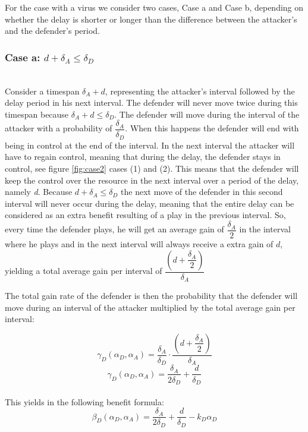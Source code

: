 \documentclass[journal,a4paper]{IEEEtran}
\begin{document}
For the case with a virus we consider two cases, Case a and Case b, depending on whether the delay is shorter or longer than the difference between the attacker's and the defender's period.  \\


\subsubsection*{\textbf{Case a:} $d + \delta_{A} \leq \delta_{D}$}
~~\\
Consider a timespan $\delta_{A} + d$, representing the attacker's interval followed by the delay period in his next interval. The defender will never move twice during this timespan because $\delta_{A} + d \leq \delta_{D}$. The defender will move during the interval of the attacker with a probability of $\dfrac{\delta_{A}}{\delta_{D}} $. When this happens the defender will end with being in control at the end of the interval. In the next interval the attacker will have to regain control, meaning that during the delay, the defender stays in control, see figure \ref{fig:case2} cases (1) and (2). This means that the defender will keep the control over the resource in the next interval over a period of the delay, namely \textit{d}. Because $d + \delta_{A} \leq \delta_{D}$ the next move of the defender in this second interval will never occur during the delay, meaning that the entire delay can be considered as an extra benefit resulting of a play in the previous interval. 
So, every time the defender plays, he will get an average gain of $\dfrac{\delta_{A}}{2}$ in the interval where he plays and in the next interval will always receive a extra gain of $d$, yielding a total average gain per interval of
$\dfrac{(d+\dfrac{\delta_{A}}{2})}{\delta_{A}}$

The total gain  rate of the defender is then the probability that the defender will move during an interval of the attacker multiplied by the total average gain per interval: 

\begin{equation}\label{first}
\gamma_{D}(\alpha_{D},\alpha_{A}) = \dfrac{\delta_{A}}{\delta_{D}} \cdot \dfrac{(d+\dfrac{\delta_{A}}{2})}{\delta_{A}} 
\end{equation}
\begin{equation}\label{first}
\gamma_{D}(\alpha_{D},\alpha_{A}) = \dfrac{\delta_{A}}{2\delta_{D}} + \dfrac{d}{\delta_{D}} 
\end{equation}\\
This yields in the following benefit formula:
\begin{equation}\label{first}
\beta_{D}(\alpha_{D},\alpha_{A}) = \dfrac{\delta_{A}}{2\delta_{D}} + \dfrac{d}{\delta_{D}} - k_{D} \alpha_{D} 
\end{equation}\\
\end{document}
